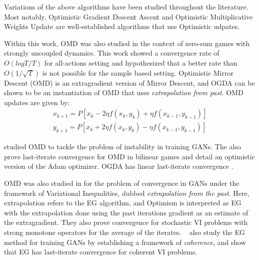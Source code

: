 Variations of the above algorithms have been studied throughout the literature.
Most notably, Optimistic Gradient Descent Ascent and Optimistic Multiplicative Weights Update are
well-established algorithms that use Optimistic udpates.

Within this work, OMD was also studied in the context of zero-sum games with strongly uncoupled
dynamics.
This work showed a convergence rate of $O(log T/T)$ for all-actions setting and hypothesized that a
better rate than $O(1/\sqrt{T})$ is not possible for the sample based setting.
Optimistic Mirror Descent (OMD) is an extragradient version of Mirror Descent, and OGDA can be
shown to be an instantiation of OMD that uses \textit{extrapolation from past}.
OMD updates are given by:
\begin{equation}
	\label{eqn:eg}
	\begin{split}
		x_{k+1} = P[x_k - 2\eta
				f(x_k, y_k) + \eta f(x_{k-1}, y_{k-1})] \\ y_{k+1} = P[x_k + 2\eta f(x_k, y_k) - \eta f(x_{k-1},
				y_{k-1})]
	\end{split}
\end{equation}

\cite{daskalakisTraining2018} studied OMD
to tackle the problem of instability in training GANs.
The also prove last-iterate convergence for OMD in bilinear games and detail an optimistic version
of the Adam optimizer.
OGDA has linear last-iterate convergence \cite{daskalakisTraining2018}.

OMD was also studied in \cite{gidelVariational2020} for the problem of convergence in GANs under
the framework of Variational Inequalities, dubbed \textit{extrapolation from the past}.
Here, extrapolation refers to the EG algorithm, and Optimism is interpreted as EG with the
extrapolation done using the past iterations gradient as an estimate of the extragradient.
They also prove convergence for stochastic VI problems with strong monotone operators for the
average of the iterates.
~\cite{mertikopoulosOptimistic2019} also study the EG method for training GANs by establishing a framework of
\textit{coherence}, and show that EG has last-iterate convergence for coherent VI problems.

